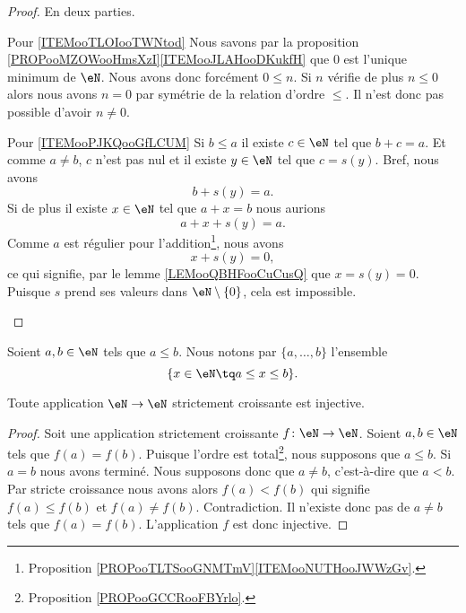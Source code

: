 \begin{proof}
    En deux parties.
    \begin{subproof}
    \item[Pour \ref{ITEMooTLOIooTWNtod}]
    Nous savons par la proposition \ref{PROPooMZOWooHmsXzI}\ref{ITEMooJLAHooDKukfH} que \( 0\) est l'unique minimum de \( \eN\). Nous avons donc forcément \( 0\leq n\). Si \( n\) vérifie de plus \( n\leq 0\) alors nous avons \( n=0\) par symétrie de la relation d'ordre \( \leq\). Il n'est donc pas possible d'avoir \( n\neq 0\).
\item[Pour \ref{ITEMooPJKQooGfLCUM}]
    Si \( b\leq a\) il existe \( c\in \eN\) tel que \( b+c=a\). Et comme \( a\neq b\), \( c\) n'est pas nul et il existe \( y\in \eN\) tel que \( c=s(y)\). Bref, nous avons
    \begin{equation}
        b+s(y)=a.
    \end{equation}
    Si de plus il existe \( x\in \eN\) tel que \( a+x=b\) nous aurions
    \begin{equation}
        a+x+s(y)=a.
    \end{equation}
    Comme \( a\) est régulier pour l'addition\footnote{Proposition \ref{PROPooTLTSooGNMTmV}\ref{ITEMooNUTHooJWWzGv}.}, nous avons
    \begin{equation}
        x+s(y)=0,
    \end{equation}
    ce qui signifie, par le lemme \ref{LEMooQBHFooCuCusQ} que \( x=s(y)=0\). Puisque \( s\) prend ses valeurs dans \( \eN\setminus\{ 0 \}\), cela est impossible.
    \end{subproof}
\end{proof}

\begin{definition}      \label{DEFooKBUFooLvMHrf}
    Soient \( a,b\in \eN\) tels que \( a\leq b\). Nous notons par \( \{ a,\ldots, b \}\) l'ensemble
    \begin{equation}
        \{ x\in \eN\tq a\leq x\leq b \}.
    \end{equation}
\end{definition}

\begin{proposition}     \label{PROPooFYMJooWihvhk}
    Toute application \( \eN\to \eN\) strictement croissante est injective.
\end{proposition}

\begin{proof}
    Soit une application strictement croissante \( f\colon \eN\to \eN\). Soient \( a,b\in \eN\) tels que \( f(a)=f(b)\). Puisque l'ordre est total\footnote{Proposition \ref{PROPooGCCRooFBYrlo}.}, nous supposons que \( a\leq b\). Si \( a=b\) nous avons terminé. Nous supposons donc que \( a\neq b\), c'est-à-dire que \( a<b\). Par stricte croissance nous avons alors \( f(a)<f(b)\) qui signifie \( f(a)\leq f(b)\) et \( f(a)\neq f(b)\). Contradiction. Il n'existe donc pas de \( a\neq b\) tels que \( f(a)=f(b)\). L'application \( f\) est donc injective.
\end{proof}

